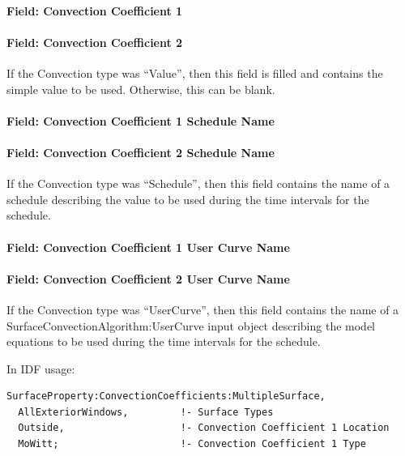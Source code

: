 \paragraph{Field: Convection Coefficient 1}\label{field-convection-coefficient-1-1}

\paragraph{Field: Convection Coefficient 2}\label{field-convection-coefficient-2-1}

If the Convection type was ``Value'', then this field is filled and contains the simple value to be used. Otherwise, this can be blank.

\paragraph{Field: Convection Coefficient 1 Schedule Name}\label{field-convection-coefficient-1-schedule-name-1}

\paragraph{Field: Convection Coefficient 2 Schedule Name}\label{field-convection-coefficient-2-schedule-name-1}

If the Convection type was ``Schedule'', then this field contains the name of a schedule describing the value to be used during the time intervals for the schedule.

\paragraph{Field: Convection Coefficient 1 User Curve Name}\label{field-convection-coefficient-1-user-curve-name-1}

\paragraph{Field: Convection Coefficient 2 User Curve Name}\label{field-convection-coefficient-2-user-curve-name-1}

If the Convection type was ``UserCurve'', then this field contains the name of a SurfaceConvectionAlgorithm:UserCurve input object describing the model equations to be used during the time intervals for the schedule.

In IDF usage:

\begin{lstlisting}
SurfaceProperty:ConvectionCoefficients:MultipleSurface,
  AllExteriorWindows,         !- Surface Types
  Outside,                    !- Convection Coefficient 1 Location
  MoWitt;                     !- Convection Coefficient 1 Type
\end{lstlisting}

